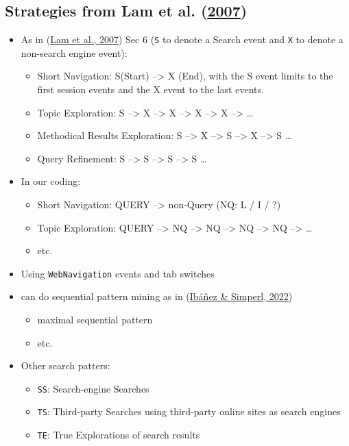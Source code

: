 \documentclass[letterpaper, nobind]{templates/ociamthesis}
\providecommand{\tightlist}{%
  \setlength{\itemsep}{0pt}\setlength{\parskip}{0pt}}
\begin{document}
\hypertarget{strategies-from-lam2007session}{%
\subsection{\texorpdfstring{Strategies from Lam et al. (\protect\hyperlink{ref-lam2007session}{2007})}{Strategies from Lam et al. (2007)}}\label{strategies-from-lam2007session}}

\begin{itemize}
\tightlist
\item
  As in (\protect\hyperlink{ref-lam2007session}{Lam et al., 2007}) Sec 6 (\texttt{S} to denote a Search event and \texttt{X} to denote a non-search engine event):

  \begin{itemize}
  \tightlist
  \item
    Short Navigation: S(Start) --\textgreater{} X (End), with the S event limits to the first session events and the X event to the last events.
  \item
    Topic Exploration: S --\textgreater{} X --\textgreater{} X --\textgreater{} X --\textgreater{} X --\textgreater{} \ldots{}
  \item
    Methodical Results Exploration: S --\textgreater{} X --\textgreater{} S --\textgreater{} X --\textgreater{} S \ldots{}
  \item
    Query Refinement: S --\textgreater{} S --\textgreater{} S --\textgreater{} S \ldots{}
  \end{itemize}
\item
  In our coding:

  \begin{itemize}
  \tightlist
  \item
    Short Navigation: QUERY --\textgreater{} non-Query (NQ: L / I / ?)
  \item
    Topic Exploration: QUERY --\textgreater{} NQ --\textgreater{} NQ --\textgreater{} NQ --\textgreater{} NQ --\textgreater{} \ldots{}
  \item
    etc.
  \end{itemize}
\item
  Using \texttt{WebNavigation} events and tab switches
\item
  can do sequential pattern mining as in (\protect\hyperlink{ref-ibanez2022comparison}{Ibáñez \& Simperl, 2022})

  \begin{itemize}
  \tightlist
  \item
    maximal sequential pattern
  \item
    etc.
  \end{itemize}
\item
  Other search patters:

  \begin{itemize}
  \tightlist
  \item
    \texttt{SS}: Search-engine Searches
  \item
    \texttt{TS}: Third-party Searches using third-party online sites as search engines
  \item
    \texttt{TE}: True Explorations of search results
  \end{itemize}
\end{itemize}
\end{document}
